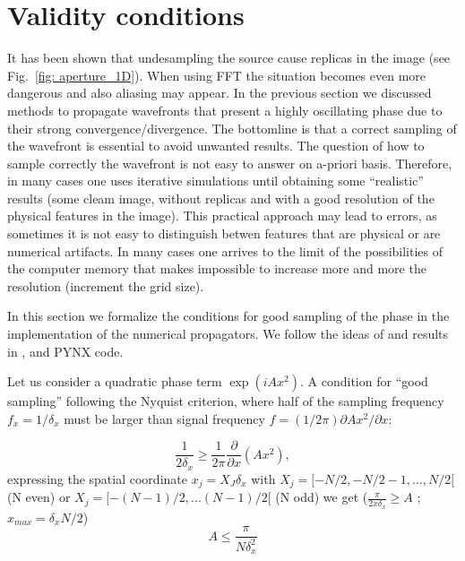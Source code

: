 \documentclass{iucr}              %
\newcommand{\inblue}[1]{{\color{blue}#1}}
\begin{document}
\section{Validity conditions}
\label{ch: validity}

It has been shown that undesampling the source cause replicas in the image (see Fig.~\ref{fig: aperture_1D}). When using FFT the situation becomes even more dangerous and also aliasing may appear. In the previous section we discussed methods to propagate wavefronts that present a highly oscillating phase due to their strong convergence/divergence. The bottomline is that a correct sampling of the wavefront is essential to avoid unwanted results. The question of how to sample correctly the wavefront is not easy to answer on a-priori basis. Therefore, in many cases one uses iterative simulations until obtaining some ``realistic'' results (some cleam image, without replicas and with a good resolution of the physical features in the image). This practical approach may lead to errors, as sometimes it is not easy to distinguish betwen features that are physical or are numerical artifacts. In many cases one arrives to the limit of the possibilities of the computer memory that makes impossible to increase more and more the resolution (increment the grid size).

In this section we formalize the conditions for good sampling of the phase in the implementation of the numerical propagators. We follow the ideas of \cite{goodmanfourier} and results in \cite{schmidt}, \cite{pirro} and PYNX code.  

Let us consider a quadratic phase term $\exp(i A x^2)$. A condition for ``good sampling'' following the Nyquist criterion, where half of the sampling frequency $f_x = 1/\delta_x$ must be larger than signal frequency $f=(1/2 \pi) \partial{Ax^2}/\partial{x}$:

\begin{equation}
 \frac{1}{2 \delta_x} \ge \frac{1}{2 \pi} \frac{\partial}{\partial x}(A x^2),
\end{equation}
expressing the spatial coordinate $x_j=X_J \delta_x$ with $X_j = [-N/2,-N/2 -1, ..., N/2[$ (N even) or $X_j = [-(N-1)/2,...(N-1)/2[$ (N odd) we get
\inblue{($\frac{\pi}{2 x \delta_x} \ge A$ ;  $x_{max} = \delta_x N/2$)}
\begin{equation}\label{eq: validity condition}
A \leq \frac{\pi}{N \delta_x^2}
\end{equation}
\end{document}
